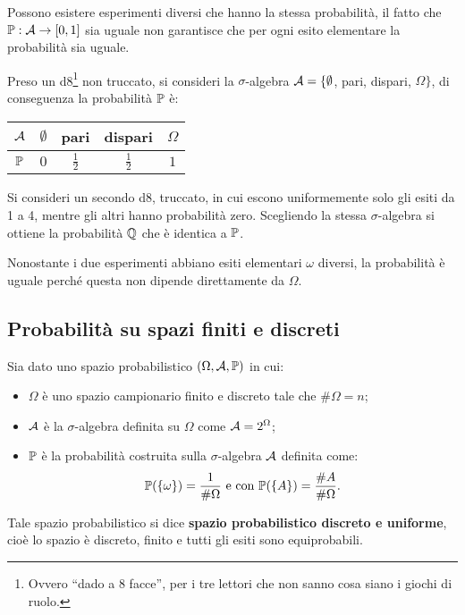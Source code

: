 \medskip
\begin{nb}
  Possono esistere esperimenti diversi che hanno la stessa probabilità, il fatto che $\mathbb P: \mathcal A \to [0,1]$ sia uguale non garantisce che per ogni esito elementare la probabilità sia uguale.
\end{nb}
\begin{ese}
  Preso un d8\footnote{Ovvero ``dado a 8 facce'', per i tre lettori che non sanno cosa siano i giochi di ruolo.} non truccato, si consideri la $\sigma$-algebra $\mathcal A = \{\emptyset$, pari, dispari, $\Omega\}$, di conseguenza la probabilità $\mathbb P$ è:
  \begin{table}[H]
    \def\arraystretch{1.5}
    \centering
    \begin{tabular}{|c|c|c|c|c|}
    \hline
    $\mathcal A$ & $\emptyset$ & pari & dispari & $\Omega$ \\ \hline
    $\mathbb P$ & $0$ & $\frac{1}{2}$ & $\frac{1}{2}$ & $1$ \\ \hline
    \end{tabular}
  \end{table}
  Si consideri un secondo d8, truccato, in cui escono uniformemente solo gli esiti da 1 a 4, mentre gli altri hanno probabilità zero. Scegliendo la stessa $\sigma$-algebra si ottiene la probabilità $\mathbb Q$ che è identica a $\mathbb P$.

  Nonostante i due esperimenti abbiano esiti elementari $\omega$ diversi, la probabilità è uguale perché questa non dipende direttamente da $\Omega$.
\end{ese}


\subsection{Probabilità su spazi finiti e discreti}
\begin{defn}
  Sia dato uno spazio probabilistico $(\Omega,\mathcal A,\mathbb P)$ in cui:
  \begin{itemize}
    \item $\Omega$ è uno spazio campionario finito e discreto tale che $\#\Omega = n$;
    \item $\mathcal A$ è la $\sigma$-algebra definita su $\Omega$ come $\mathcal A = 2^{\Omega}$;
    \item $\mathbb P$ è la probabilità costruita sulla $\sigma$-algebra $\mathcal A$ definita come:
    $$\mathbb P(\{\omega\})=\frac{1}{\#\Omega} \text{ e con } \mathbb P(\{A\})=\frac{\#A}{\#\Omega}.$$
  \end{itemize}
  Tale spazio probabilistico si dice \textbf{spazio probabilistico discreto e uniforme}, cioè lo spazio è discreto, finito e tutti gli esiti sono equiprobabili.
\end{defn}
\cleardoublepage
